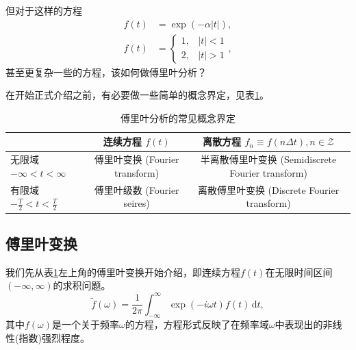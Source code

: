但对于这样的方程
\begin{equation*}
\begin{split}
    f(t) &  = \exp \left( - \alpha \left| t \right| \right), \\
    f(t) & = \begin{cases}
    1, & \left| t \right| < 1 \\
    2, & \left| t \right| > 1
    \end{cases},
\end{split}
\end{equation*}
甚至更复杂一些的方程，该如何做傅里叶分析？

在开始正式介绍之前，有必要做一些简单的概念界定，见表\ref{tab:fourier-analysis-definition}。

\begin{table}[htbp]
\caption{傅里叶分析的常见概念界定}
\begin{tabular}{|l|c|c|}
\hline
 & 连续方程 $f(t)$ & 离散方程 $f_{n} \equiv f \left( n \Delta t \right), n \in \mathcal{Z}$\\ \hline
无限域 $- \infty < t < \infty$  & 傅里叶变换 (Fourier transform) \index{Fourier transform! \dotfill 傅里叶变换}& 半离散傅里叶变换 (Semidiscrete Fourier transform)\index{Fourier transform!Semidiscrete \dotfill 半离散傅里叶变换} \\ \hline
有限域 $- \frac{T}{2} < t < \frac{T}{2}$ & 傅里叶级数 (Fourier seires)\index{Fourier series \dotfill 傅里叶级数} & 离散傅里叶变换 (Discrete Fourier transform)\index{Fourier transform!Discrete \dotfill 离散傅里叶变换} \\ \hline
\end{tabular}
\label{tab:fourier-analysis-definition}
\end{table}

\subsection{傅里叶变换}
\label{sec:fourier-transform}
我们先从表\ref{tab:fourier-analysis-definition}左上角的傅里叶变换开始介绍，即连续方程$f(t)$在无限时间区间$(-\infty, \infty)$的求积问题。
\begin{equation}
  \label{sec:fourier-transform-definition}
  \tilde{f} \left( \omega \right) =
  \frac{1}{2 \pi} \int_{-\infty}^{\infty}
  \exp \left( - i \omega t \right) f(t) \, \mathrm{d} t,
\end{equation}
其中$f \left( \omega \right)$是一个关于频率$\omega$的方程，方程形式反映了在频率域$\omega$中表现出的非线性(指数)强烈程度。


